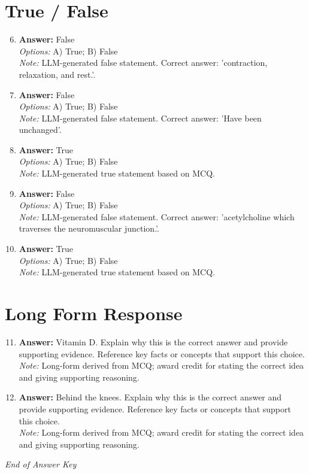 \documentclass[12pt]{article}
\begin{document}
\section*{True / False}
\begin{enumerate}[label=\arabic*.]
\setcounter{enumi}{5}
\item \textbf{Answer:} False
\\ \textit{Options:} A) True; B) False
\\ \textit{Note:} LLM-generated false statement. Correct answer: 'contraction, relaxation, and rest.'.
\item \textbf{Answer:} False
\\ \textit{Options:} A) True; B) False
\\ \textit{Note:} LLM-generated false statement. Correct answer: 'Have been unchanged'.
\item \textbf{Answer:} True
\\ \textit{Options:} A) True; B) False
\\ \textit{Note:} LLM-generated true statement based on MCQ.
\item \textbf{Answer:} False
\\ \textit{Options:} A) True; B) False
\\ \textit{Note:} LLM-generated false statement. Correct answer: 'acetylcholine which traverses the neuromuscular junction.'.
\item \textbf{Answer:} True
\\ \textit{Options:} A) True; B) False
\\ \textit{Note:} LLM-generated true statement based on MCQ.
\end{enumerate}

\section*{Long Form Response}
\begin{enumerate}[label=\arabic*.]
\setcounter{enumi}{10}
\item \textbf{Answer:} Vitamin D. Explain why this is the correct answer and provide supporting evidence. Reference key facts or concepts that support this choice.
\\ \textit{Note:} Long-form derived from MCQ; award credit for stating the correct idea and giving supporting reasoning.
\item \textbf{Answer:} Behind the knees. Explain why this is the correct answer and provide supporting evidence. Reference key facts or concepts that support this choice.
\\ \textit{Note:} Long-form derived from MCQ; award credit for stating the correct idea and giving supporting reasoning.
\end{enumerate}

\vfill
\noindent\textit{End of Answer Key}
\end{document}
